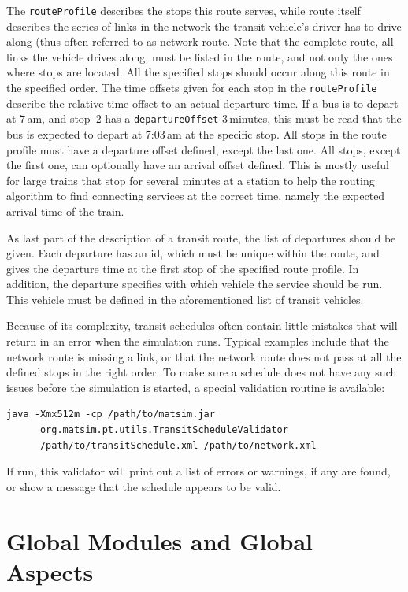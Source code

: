 The \lstinline|routeProfile| describes the stops this route serves, while route itself describes the series of links in the network the transit vehicle's driver has to drive along (thus often referred to as network route. Note that the complete route, \ie all links the vehicle drives along, must be listed in the route, and not only the ones where stops are located. All the specified stops should occur along this route in the specified order. The time offsets given for each stop in the \lstinline|routeProfile| describe the relative time offset to an actual departure time. If a bus is to depart at 7\,am, and stop~2 has a \lstinline|departureOffset| 3\,minutes, this must be read that the bus is expected to depart at 7:03\,am at the specific stop. All stops in the route profile must have a departure offset defined, except the last one. All stops, except the first one, can optionally have an arrival offset defined. This is mostly useful for large trains that stop for several minutes at a station to help the routing algorithm to find connecting services at the correct time, namely the expected arrival time of the train.

As last part of the description of a transit route, the list of departures should be given. Each departure has an id, which must be unique within the route, and gives the departure time at the first stop of the specified route profile. In addition, the departure specifies with which vehicle the service should be run. This vehicle must be defined in the aforementioned list of transit vehicles. 

Because of its complexity, transit schedules often contain little mistakes that will return in an error when the simulation runs. Typical examples include that the network route is missing a link, or that the network route does not pass at all the defined stops in the right order. To make sure a schedule does not have any such issues before the simulation is started, a special validation routine is available:
%
\begin{lstlisting}
java -Xmx512m -cp /path/to/matsim.jar  
      org.matsim.pt.utils.TransitScheduleValidator  
      /path/to/transitSchedule.xml /path/to/network.xml
\end{lstlisting}
%
If run, this validator will print out a list of errors or warnings, if any are found, or show a message that the schedule appears to be valid.

\section{Global Modules and Global Aspects}
\label{sec:extending-globalmodules}
